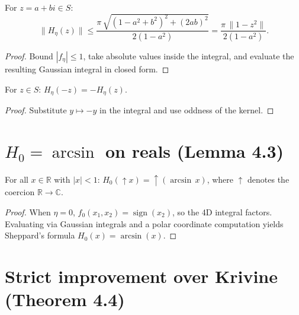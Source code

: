 \begin{lemma}[Bound (43)]
  \label{lem:H_eta_bound}
  \leanok
  For $z = a + bi \in S$:
  \[
    \|H_\eta(z)\| \leq \frac{\pi\,\sqrt{(1-a^2+b^2)^2 + (2ab)^2}}{2(1-a^2)}
    = \frac{\pi\,\|1-z^2\|}{2(1-a^2)}.
  \]
\end{lemma}

\begin{proof}
  \leanok
  Bound $|f_\eta| \leq 1$, take absolute values inside the integral,
  and evaluate the resulting Gaussian integral in closed form.
\end{proof}

\begin{lemma}
  \label{lem:H_eta_odd}
  \leanok
  For $z \in S$: $H_\eta(-z) = -H_\eta(z)$.
\end{lemma}

\begin{proof}
  \leanok
  Substitute $y \mapsto -y$ in the integral and use oddness of the kernel.
\end{proof}

\chapter{\texorpdfstring{$H_0 = \arcsin$}{H\_0 = arcsin} on reals (Lemma 4.3)}

\begin{lemma}
  \label{lem:4_3}
  \leanok
  For all $x \in \mathbb{R}$ with $|x| < 1$:
  $H_0(\uparrow x) = \uparrow(\arcsin\, x)$,
  where $\uparrow$ denotes the coercion $\mathbb{R} \to \mathbb{C}$.
\end{lemma}

\begin{proof}
  \leanok
  When $\eta = 0$, $f_0(x_1, x_2) = \operatorname{sign}(x_2)$, so the 4D integral
  factors. Evaluating via Gaussian integrals and a polar coordinate computation
  yields Sheppard's formula $H_0(x) = \arcsin(x)$.
\end{proof}

\chapter{Strict improvement over Krivine (Theorem 4.4)}

